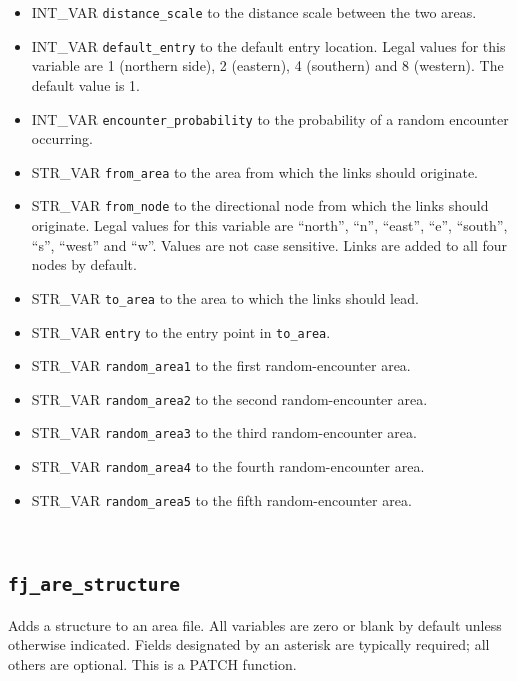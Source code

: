 \documentclass{article}
\def\DEFINE#1{{\tt \bf #1}\label{#1}\index{#1}}
\begin{document}
\begin{itemize}
\item INT_VAR \verb+distance_scale+ to the distance scale between the two areas.
\item INT_VAR \verb+default_entry+ to the default entry location. Legal values for this variable are 1 (northern side), 2 (eastern), 4 (southern) and 8 (western). The default value is 1.
\item INT_VAR \verb+encounter_probability+ to the probability of a random encounter occurring.
\item STR_VAR \verb+from_area+ to the area from which the links should originate.
\item STR_VAR \verb+from_node+ to the directional node from which the links should originate. Legal values for this variable are ``north'', ``n'', ``east'', ``e'', ``south'', ``s'', ``west'' and ``w''. Values are not case sensitive. Links are added to all four nodes by default.
\item STR_VAR \verb+to_area+ to the area to which the links should lead.
\item STR_VAR \verb+entry+ to the entry point in \verb+to_area+.
\item STR_VAR \verb+random_area1+ to the first random-encounter area.
\item STR_VAR \verb+random_area2+ to the second random-encounter area.
\item STR_VAR \verb+random_area3+ to the third random-encounter area.
\item STR_VAR \verb+random_area4+ to the fourth random-encounter area.
\item STR_VAR \verb+random_area5+ to the fifth random-encounter area.
\end{itemize}
\\

\subsection{\DEFINE{fj_are_structure}}
Adds a structure to an area file. All variables are zero or blank by default unless otherwise indicated. Fields designated by an asterisk are typically required; all others are optional.
This is a PATCH function.
\end{document}
